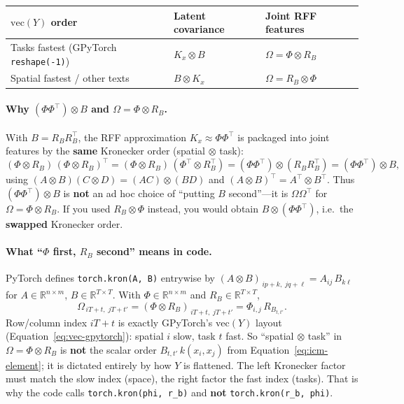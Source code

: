 \documentclass[11pt]{article}
\theoremstyle{plain}
\newcommand{\Ph}{\Phi}
\newcommand{\Om}{\Omega}
\newcommand{\RB}{R_B}
\begin{document}
\begin{center}
\renewcommand{\arraystretch}{1.2}
\begin{tabular}{@{}lll@{}}
\toprule
\textbf{$\mathrm{vec}(Y)$ order} & \textbf{Latent covariance} & \textbf{Joint RFF features} \\
\midrule
Tasks fastest (GPyTorch \texttt{reshape(-1)}) & $K_x \otimes B$ & $\Om = \Ph \otimes \RB$ \\
Spatial fastest / other texts & $B \otimes K_x$ & $\Om = \RB \otimes \Ph$ \\
\bottomrule
\end{tabular}
\end{center}

\paragraph{Why $(\Ph\Ph^\top) \otimes B$ and $\Om = \Ph \otimes \RB$.}
With $B = \RB\RB^\top$, the RFF approximation $K_x \approx \Ph\Ph^\top$ is packaged into joint
features by the \textbf{same} Kronecker order (spatial $\otimes$ task):
\begin{equation}
  \label{eq:kron-feature-identity}
  (\Ph \otimes \RB)\,(\Ph \otimes \RB)^\top
  = (\Ph \otimes \RB)\,(\Ph^\top \otimes \RB^\top)
  = (\Ph\Ph^\top) \otimes (\RB\RB^\top)
  = (\Ph\Ph^\top) \otimes B,
\end{equation}
using $(A \otimes B)(C \otimes D) = (AC) \otimes (BD)$ and $(A \otimes B)^\top = A^\top \otimes B^\top$.
Thus $(\Ph\Ph^\top) \otimes B$ is \textbf{not} an ad hoc choice of ``putting $B$ second''---it is
$\Om\Om^\top$ for $\Om = \Ph \otimes \RB$.
If you used $\RB \otimes \Ph$ instead, you would obtain $B \otimes (\Ph\Ph^\top)$, i.e.\ the
\textbf{swapped} Kronecker order.

\paragraph{What ``$\Ph$ first, $\RB$ second'' means in code.}
PyTorch defines \texttt{torch.kron(A, B)} entrywise by
$(A \otimes B)_{\,ip+k,\; jq+\ell} = A_{ij}\,B_{k\ell}$
for $A \in \mathbb{R}^{n \times m}$, $B \in \mathbb{R}^{T \times T}$.
With $\Ph \in \mathbb{R}^{n \times m}$ and $\RB \in \mathbb{R}^{T \times T}$,
\begin{equation}
  \label{eq:kron-torch-index}
  \Om_{\,iT + t,\; jT + t'}
  = (\Ph \otimes \RB)_{\,iT + t,\; jT + t'}
  = \Ph_{i,j}\,\RB_{t,t'}.
\end{equation}
Row/column index $iT + t$ is exactly GPyTorch's $\mathrm{vec}(Y)$ layout
(Equation~\eqref{eq:vec-gpytorch}): spatial $i$ slow, task $t$ fast.
So ``spatial $\otimes$ task'' in $\Om = \Ph \otimes \RB$ is \textbf{not} the scalar order
$B_{t,t'}\,k(x_i,x_j)$ from Equation~\eqref{eq:icm-element}; it is dictated entirely by
how $Y$ is flattened. The left Kronecker factor must match the slow index (space),
the right factor the fast index (tasks). That is why the code calls
\texttt{torch.kron(phi, r\_b)} and \textbf{not} \texttt{torch.kron(r\_b, phi)}.
\end{document}
